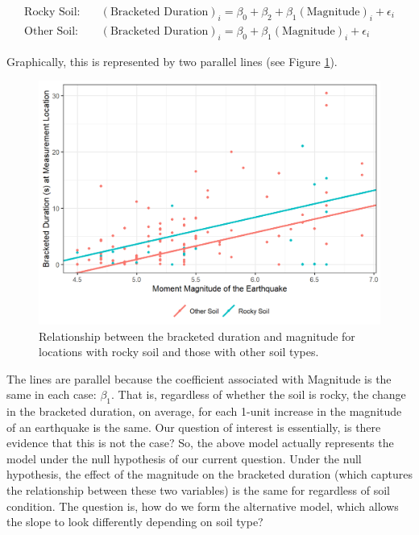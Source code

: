 \documentclass[
]{book}
\theoremstyle{plain}
\theoremstyle{mydefn}
\theoremstyle{myexmpl}
\theoremstyle{remark}
\begin{document}
\[
\begin{aligned}
  \text{Rocky Soil:} &\quad (\text{Bracketed Duration})_i = \beta_0 + \beta_2 + \beta_1(\text{Magnitude})_i + \epsilon_i\\
  \text{Other Soil:} &\quad (\text{Bracketed Duration})_i = \beta_0 + \beta_1(\text{Magnitude})_i + \epsilon_i
\end{aligned}
\]

Graphically, this is represented by two parallel lines (see Figure \ref{fig:regextensions-ind-plot}).

\begin{figure}

{\centering \includegraphics[width=0.8\linewidth]{./Images/regextensions-ind-plot-1} 

}

\caption{Relationship between the bracketed duration and magnitude for locations with rocky soil and those with other soil types.}\label{fig:regextensions-ind-plot}
\end{figure}

The lines are parallel because the coefficient associated with Magnitude is the same in each case: \(\beta_1\). That is, regardless of whether the soil is rocky, the change in the bracketed duration, on average, for each 1-unit increase in the magnitude of an earthquake is the same. Our question of interest is essentially, is there evidence that this is not the case? So, the above model actually represents the model under the null hypothesis of our current question. Under the null hypothesis, the effect of the magnitude on the bracketed duration (which captures the relationship between these two variables) is the same for regardless of soil condition. The question is, how do we form the alternative model, which allows the slope to look differently depending on soil type?
\end{document}
